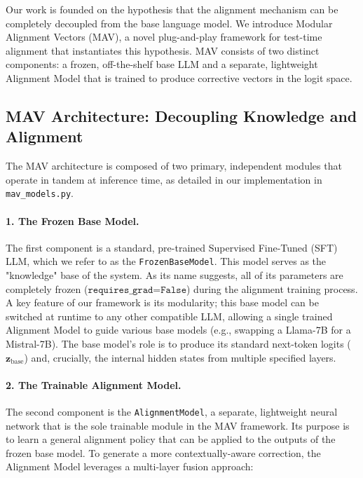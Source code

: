 \documentclass{article} %
\begin{document}
Our work is founded on the hypothesis that the alignment mechanism can be completely decoupled from the base language model. We introduce Modular Alignment Vectors (MAV), a novel plug-and-play framework for test-time alignment that instantiates this hypothesis. MAV consists of two distinct components: a frozen, off-the-shelf base LLM and a separate, lightweight Alignment Model that is trained to produce corrective vectors in the logit space.

\subsection{MAV Architecture: Decoupling Knowledge and Alignment}

The MAV architecture is composed of two primary, independent modules that operate in tandem at inference time, as detailed in our implementation in \texttt{mav\_models.py}.

\paragraph{1. The Frozen Base Model.}
The first component is a standard, pre-trained Supervised Fine-Tuned (SFT) LLM, which we refer to as the \texttt{FrozenBaseModel}. This model serves as the "knowledge" base of the system. As its name suggests, all of its parameters are completely frozen ($\texttt{requires\_grad=False}$) during the alignment training process. A key feature of our framework is its modularity; this base model can be switched at runtime to any other compatible LLM, allowing a single trained Alignment Model to guide various base models (e.g., swapping a Llama-7B for a Mistral-7B). The base model's role is to produce its standard next-token logits ($\mathbf{z}_{\text{base}}$) and, crucially, the internal hidden states from multiple specified layers.

\paragraph{2. The Trainable Alignment Model.}
The second component is the \texttt{AlignmentModel}, a separate, lightweight neural network that is the sole trainable module in the MAV framework. Its purpose is to learn a general alignment policy that can be applied to the outputs of the frozen base model. To generate a more contextually-aware correction, the Alignment Model leverages a multi-layer fusion approach:
\end{document}
